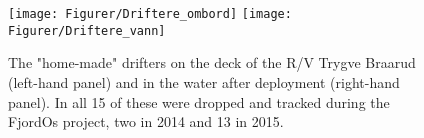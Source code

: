 \begin{figure}[htb]
	\centerline{
		\texttt{[image: Figurer/Driftere\_ombord]}\hspace{2cm}
		\texttt{[image: Figurer/Driftere\_vann]}
		}
	\caption{\small The "home-made" drifters on the deck of the R/V Trygve Braarud (left-hand panel) and in the water after deployment (right-hand panel). In all 15 of these were dropped and tracked during the FjordOs project, two in 2014 and 13 in 2015.}
	\label{fig:drifters_design}
\end{figure}


